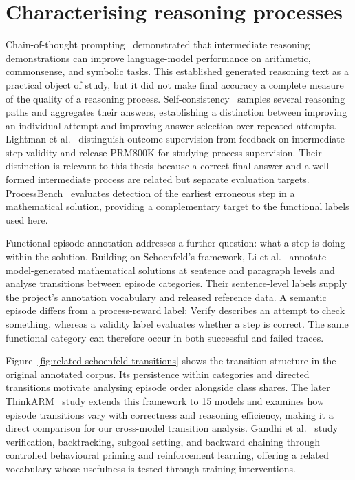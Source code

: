 \documentclass[12pt,a4paper,twoside,openright]{book}
\begin{document}
\section{Characterising reasoning processes}

Chain-of-thought prompting~\cite{wei2022cot} demonstrated that intermediate
reasoning demonstrations can improve language-model performance on arithmetic,
commonsense, and symbolic tasks. This established generated
reasoning text as a practical object of study, but it did not make final
accuracy a complete measure of the quality of a reasoning process.
Self-consistency~\cite{wang2023selfconsistency} samples several reasoning
paths and aggregates their answers, establishing a distinction between improving
an individual attempt and improving answer selection over repeated attempts.
Lightman et al.~\cite{lightman2023verify} distinguish outcome supervision from
feedback on intermediate step validity and release PRM800K for studying
process supervision. Their distinction is relevant to this thesis
because a correct final answer and a well-formed intermediate process are
related but separate evaluation targets.
ProcessBench~\cite{zheng2025processbench} evaluates detection of the earliest
erroneous step in a mathematical solution, providing a complementary
target to the functional labels used here.

Functional episode annotation addresses a further question: what a step is
doing within the solution. Building on Schoenfeld's framework,
Li et al.~\cite{li2025schoenfeld} annotate model-generated mathematical
solutions at sentence and paragraph levels and analyse transitions between
episode categories. Their sentence-level labels supply the project's
annotation vocabulary and released reference data. A semantic episode differs
from a process-reward label: Verify describes an attempt to check something,
whereas a validity label evaluates whether a step is correct. The same
functional category can therefore occur in both successful and failed traces.

Figure~\ref{fig:related-schoenfeld-transitions} shows the transition structure
in the original annotated corpus. Its persistence within categories and
directed transitions motivate analysing episode order alongside class shares.
The later ThinkARM~\cite{li2026thinkarm} study extends this framework to 15
models and examines how episode transitions vary with correctness and
reasoning efficiency, making it a direct comparison for our cross-model
transition analysis.
Gandhi et al.~\cite{gandhi2025cognitive} study verification, backtracking,
subgoal setting, and backward chaining through controlled behavioural priming
and reinforcement learning, offering a related vocabulary whose usefulness is
tested through training interventions.
\end{document}
